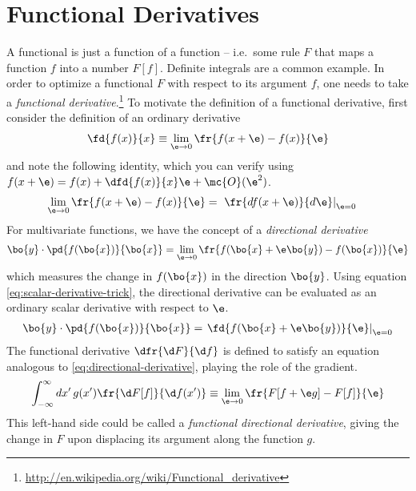 \chapter{Functional Derivatives}\label{app:functional-derivatives}

A functional is just a function of a function -- i.e.\ some rule $F$ that maps a function $f$ into a number $F[f]$.  Definite integrals are a common example.
In order to optimize a functional $F$ with respect to its argument $f$, one needs to take a \textit{functional derivative}.\footnote{\url{http://en.wikipedia.org/wiki/Functional_derivative}}
To motivate the definition of a functional derivative, first consider the definition of an ordinary derivative
\begin{align}
  \fd{f(x)}{x}
\equiv
  \lim_{\e\rightarrow0}
  \fr{f(x+\e)-f(x)}{\e}
\end{align}
and note the following identity, which you can verify using
$
  f(x+\e)
=
  f(x)
+
  \dfd{f(x)}{x}
  \e
+
  \mc{O}(\e^2)
$.
\begin{align}\label{eq:scalar-derivative-trick}
  \lim_{\e\rightarrow0}
  \fr{f(x+\e)-f(x)}{\e}
=&\
\left.
  \fr{df(x+\e)}{d\e}
\right|_{\e=0}
\end{align}
For multivariate functions, we have the concept of a \textit{directional derivative}
\begin{align}\label{eq:directional-derivative}
  \bo{y}\cdot
  \pd{f(\bo{x})}{\bo{x}}
=
  \lim_{\e\rightarrow0}
  \fr{f(\bo{x}+\e\bo{y}) - f(\bo{x})}{\e}
\end{align}
which measures the change in $f(\bo{x})$ in the direction $\bo{y}$.
Using equation \ref{eq:scalar-derivative-trick}, the directional derivative can be evaluated as an ordinary scalar derivative with respect to $\e$.
\begin{align}\label{eq:vector-derivative-trick}
  \bo{y}\cdot
  \pd{f(\bo{x})}{\bo{x}}
=
  \left.
  \fd{f(\bo{x} + \e\bo{y})}{\e}
  \right|_{\e=0}
\end{align}
The functional derivative $\dfr{\d F}{\d f}$ is defined to satisfy an equation analogous to \ref{eq:directional-derivative}, playing the role of the gradient.
\begin{align}
  \int_{-\infty}^{\infty}
  dx'\,
  g(x')
  \fr{\d F[f]}{\d f(x')}
\equiv
  \lim_{\e\rightarrow0}
  \fr{F[f+\e g] - F[f]}{\e}
\end{align}
This left-hand side could be called a \textit{functional directional derivative}, giving the change in $F$ upon displacing its argument along the function $g$.
